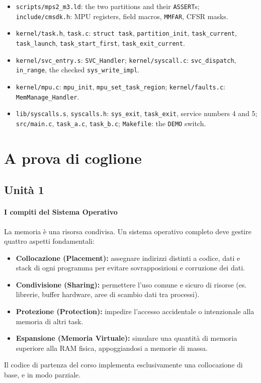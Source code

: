 \begin{itemize}
    \item \texttt{scripts/mps2\_m3.ld}: the two partitions and their \texttt{ASSERT}s; \texttt{include/cmsdk.h}: MPU registers, field macros, \texttt{MMFAR}, CFSR masks.
    \item \texttt{kernel/task.h}, \texttt{task.c}: \texttt{struct task}, \texttt{partition\_init}, \texttt{task\_current}, \texttt{task\_launch}, \texttt{task\_start\_first}, \texttt{task\_exit\_current}.
    \item \texttt{kernel/svc\_entry.s}: \texttt{SVC\_Handler}; \texttt{kernel/syscall.c}: \texttt{svc\_dispatch}, \texttt{in\_range}, the checked \texttt{sys\_write\_impl}.
    \item \texttt{kernel/mpu.c}: \texttt{mpu\_init}, \texttt{mpu\_set\_task\_region}; \texttt{kernel/faults.c}: \texttt{MemManage\_Handler}.
    \item \texttt{lib/syscalls.s}, \texttt{syscalls.h}: \texttt{sys\_exit}, \texttt{task\_exit}, service numbers 4 and 5; \texttt{src/main.c}, \texttt{task\_a.c}, \texttt{task\_b.c}; \texttt{Makefile}: the \texttt{DEMO} switch.
\end{itemize}


\section{A prova di coglione}

\subsection{Unità 1}
\paragraph*{I compiti del Sistema Operativo}
La memoria è una risorsa condivisa. Un sistema operativo completo deve gestire quattro aspetti fondamentali:
\begin{itemize}
    \item \textbf{Collocazione (Placement):} assegnare indirizzi distinti a codice, dati e stack di ogni programma per evitare sovrapposizioni e corruzione dei dati.
    \item \textbf{Condivisione (Sharing):} permettere l'uso comune e sicuro di risorse (es. librerie, buffer hardware, aree di scambio dati tra processi).
    \item \textbf{Protezione (Protection):} impedire l'accesso accidentale o intenzionale alla memoria di altri task.
    \item \textbf{Espansione (Memoria Virtuale):} simulare una quantità di memoria superiore alla RAM fisica, appoggiandosi a memorie di massa.
\end{itemize}
Il codice di partenza del corso implementa esclusivamente una collocazione di base, e in modo parziale.

